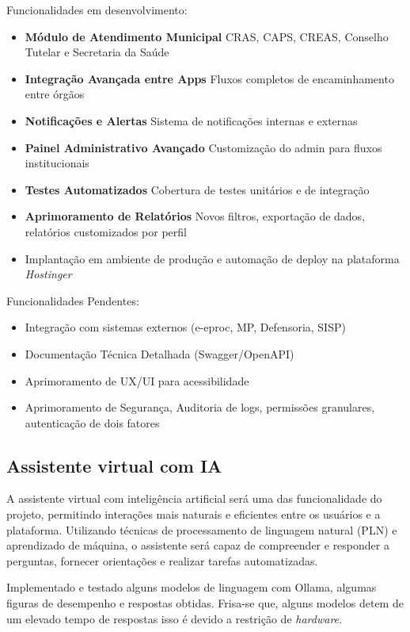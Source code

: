 Funcionalidades em desenvolvimento:
\begin{itemize}
    \item \textbf{Módulo de Atendimento Municipal} CRAS, CAPS, CREAS, Conselho Tutelar e Secretaria da Saúde
    \item \textbf{Integração Avançada entre Apps} Fluxos completos de encaminhamento entre órgãos
    \item \textbf{Notificações e Alertas} Sistema de notificações internas e externas
    \item \textbf{Painel Administrativo Avançado} Customização do admin para fluxos institucionais
    \item \textbf{Testes Automatizados} Cobertura de testes unitários e de integração
    \item \textbf{Aprimoramento de Relatórios} Novos filtros, exportação de dados, relatórios customizados por perfil
    \item Implantação em ambiente de produção e automação de deploy na plataforma \textit{Hostinger}
\end{itemize}


Funcionalidades Pendentes:
\begin{itemize}
    \item Integração com sistemas externos (e-eproc, MP, Defensoria, SISP)
    \item Documentação Técnica Detalhada (Swagger/OpenAPI)
    \item Aprimoramento de UX/UI para acessibilidade
    
    \item Aprimoramento de Segurança, Auditoria de logs, permissões granulares, autenticação de dois fatores
\end{itemize}

\subsection{Assistente virtual com IA}

\par A assistente virtual com inteligência artificial será uma das funcionalidade do projeto, permitindo interações mais naturais e eficientes entre os usuários e a plataforma. Utilizando técnicas de processamento de linguagem natural (PLN) e aprendizado de máquina, o assistente será capaz de compreender e responder a perguntas, fornecer orientações e realizar tarefas automatizadas.
\par Implementado e testado alguns modelos de linguagem com Ollama, algumas figuras de desempenho e respostas obtidas. Frisa-se que, alguns modelos detem de um elevado tempo de respostas isso é devido a restrição de \textit{hardware}.


